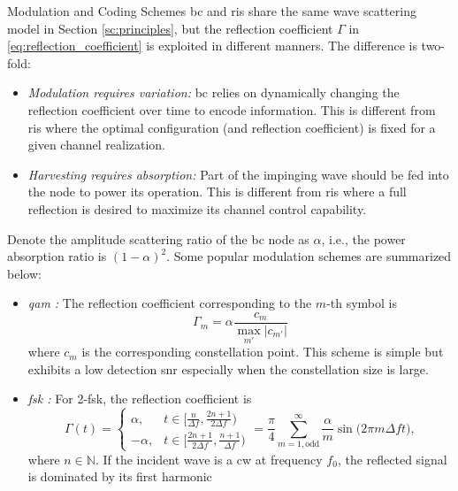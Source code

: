 \begin{section}{}
	\begin{subsection}{Modulation and Coding Schemes}
		\gls{bc} and \gls{ris} share the same wave scattering model in Section \ref{sc:principles}, but the reflection coefficient $\Gamma$ in \eqref{eq:reflection_coefficient} is exploited in different manners.
		The difference is two-fold:
		\begin{itemize}
			\item \emph{Modulation requires variation:} \gls{bc} relies on dynamically changing the reflection coefficient over time to encode information. This is different from \gls{ris} where the optimal configuration (and reflection coefficient) is fixed for a given channel realization.
			\item \emph{Harvesting requires absorption:} Part of the impinging wave should be fed into the node to power its operation. This is different from \gls{ris} where a full reflection is desired to maximize its channel control capability.
		\end{itemize}
		Denote the amplitude scattering ratio of the \gls{bc} node as $\alpha$, i.e., the power absorption ratio is $(1-\alpha)^2$. Some popular modulation schemes are summarized below:
		\begin{itemize}
			\item \emph{\gls{qam} \cite{Thomas2012a}:} The reflection coefficient corresponding to the $m$-th symbol is
			\begin{equation}
				\Gamma_m = \alpha \frac{c_m}{\max_{m'} \lvert c_{m'} \rvert}
			\end{equation}
			where $c_m$ is the corresponding constellation point.
			This scheme is simple but exhibits a low detection \gls{snr} especially when the constellation size is large.
			\item \emph{\gls{fsk} \cite{Abbasi2021a}:} For 2-\gls{fsk}, the reflection coefficient is
			\begin{equation}
				\Gamma(t) =
				\begin{cases}
					\alpha, & t \in \bigl[\frac{n}{\Delta f},\frac{2n+1}{2 \Delta f}\bigr) \\
					-\alpha, & t \in \bigl[\frac{2n+1}{2 \Delta f},\frac{n+1}{\Delta f}\bigr)
				\end{cases}
				= \frac{\pi}{4} \sum_{m=1,\text{odd}}^\infty \frac{\alpha}{m} \sin\bigl(2\pi m \Delta f t\bigr),
			\end{equation}
			where $n \in \mathbb{N}$.
			If the incident wave is a \gls{cw} at frequency $f_0$, the reflected signal is dominated by its first harmonic

\end{itemize}
\end{subsection}
\end{section}
